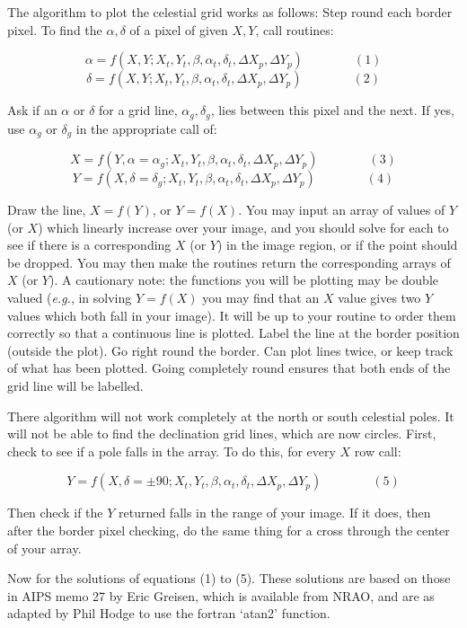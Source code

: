 The algorithm to plot the celestial grid works as follows:
Step round each border pixel.  To find the $\alpha, \delta$ of a
pixel of given $X,Y$, call routines:

$$\alpha = f(X,Y ; X_t, Y_t, \beta, \alpha_t, \delta_t, \Delta X_p,
\Delta Y_p) \qquad\qquad (1)$$
$$\delta = f(X,Y ; X_t, Y_t, \beta, \alpha_t, \delta_t, \Delta X_p,
\Delta Y_p) \qquad\qquad (2)$$

Ask if an $\alpha$ or $\delta$ for a grid line, $\alpha_g, \delta_g$,
lies between this pixel
and the next.  If yes, use $\alpha_g$ or $\delta_g$ in the appropriate
call of:

$$X = f(Y, \alpha=\alpha_g ; X_t, Y_t, \beta, \alpha_t, \delta_t,
\Delta X_p, \Delta Y_p) \qquad\qquad (3)$$
$$Y = f(X, \delta=\delta_g ; X_t, Y_t, \beta, \alpha_t, \delta_t,
\Delta X_p, \Delta Y_p) \qquad\qquad (4)$$

Draw the line, $X=f(Y)$, or $Y=f(X)$.  You may input an array of
values of $Y$ (or $X$) which linearly increase over your image, and
you should solve for each to see if there is a corresponding $X$ (or
$Y$) in the image region, or if the point should be dropped.  You may
then make the routines return the corresponding arrays of $X$ (or
$Y$). A cautionary note: the functions you will be
plotting may be double valued ({\it e.g.}, in solving  $Y=f(X)$ you
may find that an $X$ value gives two $Y$ values which both fall in
your image).  It will be up to your routine to order them correctly so
that a continuous line is plotted.
Label the line at the border position (outside the
plot).
Go right round the border.  Can plot lines twice, or keep track of
what has been plotted.  Going completely round ensures that both ends
of the grid line will be labelled.

There algorithm will not work completely at the north or south
celestial
poles. It will not be able to find the declination grid lines, which
are now circles.   First, check to see if a pole falls in the array.  To do this,
for every $X$ row call:

$$Y = f(X, \delta=\pm 90 ; X_t, Y_t, \beta, \alpha_t, \delta_t, \Delta
X_p, \Delta Y_p) \qquad\qquad (5)$$

Then check if the $Y$ returned falls in the range of your
image.
If it does, then after the border pixel checking, do the same thing
for a cross through the center of your array.


Now for the solutions of equations (1) to (5).  These solutions are
based on those in AIPS memo 27 by Eric Greisen, which is available from
NRAO, and are as adapted by Phil Hodge to use the fortran `atan2' function.

